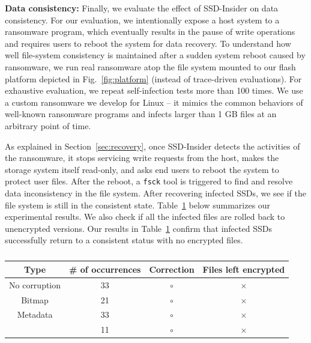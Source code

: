 \documentclass[conference]{IEEEtran}
\newcommand{\ours}{SSD-Insider}
\begin{document}
{\noindent\bf Data consistency:} 
Finally, we evaluate the effect of \ours{} on data consistency.
For our evaluation, we intentionally expose a host system to a
ransomware program, which eventually results in the pause of write
operations and requires users to reboot the system for data
recovery.  To understand how well file-system consistency is
maintained after a sudden system reboot caused by ransomware,  we
run real ransomware atop the file system mounted to our flash
platform depicted in Fig.~\ref{fig:platform} (instead of
trace-driven evaluations).  For exhaustive evaluation, we repeat
self-infection tests more than 100 times.  We use a custom
ransomware we develop for Linux -- it mimics the common behaviors
of well-known ransomware programs and infects larger than 1 GB
files at an arbitrary point of time.

As explained in Section~\ref{sec:recovery}, once \ours{}
detects the activities of the ransomware, it stops servicing write
requests from the host, makes the storage system itself read-only,
and asks end users to reboot the system to protect user files.
After the reboot, a \texttt{fsck} tool is triggered to find and
resolve data inconsistency in the file system. After recovering
infected SSDs, we see if the file system is still in the consistent
state.  Table~\ref{tab:flash-consist} below summarizes our
experimental results. We also check if all the infected files are
rolled back to unencrypted versions. Our results in
Table~\ref{tab:flash-consist} confirm that infected SSDs
successfully return to a consistent status with no encrypted files.

\begin{table}[t]
	\centering
	\caption{{\color{red}{A summary of file-system consistency checks}}}
	\begin{tabular}{c|c|c|c}
		\hline
		Type	& \# of occurrences & Correction & Files left encrypted \\
		\hline
		\hline
		No corruption		& 33 & $\circ$ & $\times$ \\ 
		Bitmap 				& 21 & $\circ$ & $\times$ \\ 
		Metadata 			& 33 & $\circ$ & $\times$ \\ 
							& 11 & $\circ$ & $\times$ \\ 
		\hline
	\end{tabular}
	\label{tab:flash-consist}
\end{table}
\end{document}
